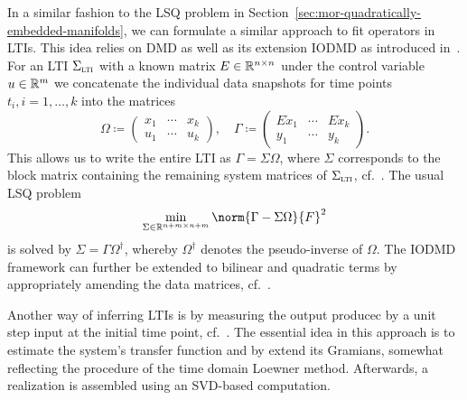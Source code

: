 In a similar fashion to the \ac{LSQ} problem in Section~\ref{sec:mor-quadratically-embedded-manifolds}, we can formulate a similar approach to fit operators in \acp{LTI}.
This idea relies on \ac{DMD} as well as its extension \ac{IODMD} as introduced in~\cite{Annoni2016}.
For an \ac{LTI} $\Sigma_{\textnormal{\scshape lti}}$ with a known matrix $E \in \mathbb{R}^{n \times n}$ under the control variable $u \in \mathbb{R}^m$ we concatenate the individual data snapshots for time points $t_i, i = 1, \dots, k$ into the matrices
\begin{equation}\label{eq:iodmd-data-matrices}
    \Omega \coloneqq \begin{pmatrix}
        x_1 & \cdots & x_k \\
        u_1 & \cdots & u_k
    \end{pmatrix},\quad \Gamma \coloneqq \begin{pmatrix}
        E \dot{x}_1 & \cdots & E \dot{x}_k \\
        y_1 & \cdots & y_k
    \end{pmatrix}.
\end{equation}
This allows us to write the entire \ac{LTI} as $\Gamma = \Sigma \Omega$, where $\Sigma$ corresponds to the block matrix containing the remaining system matrices of $\Sigma_{\textnormal{\scshape lti}}$, cf.~\cite{Heiland2022}.
The usual \ac{LSQ} problem
\begin{equation*}
    \min\limits_{\Sigma \in \bb{R}^{n + m \times n + m}} \norm{\Gamma - \Sigma \Omega}{F}^2
\end{equation*}
is solved by $\Sigma = \Gamma \Omega^\dagger$, whereby $\Omega^\dagger$ denotes the pseudo-inverse of $\Omega$.
The \ac{IODMD} framework can further be extended to bilinear and quadratic terms by appropriately amending the data matrices, cf.~\cite{Gosea2021}.


Another way of inferring \acp{LTI} is by measuring the output producec by a unit step input at the initial time point, cf.~\cite{Miller2012}.
The essential idea in this approach is to estimate the system's transfer function and by extend its Gramians, somewhat reflecting the procedure of the time domain Loewner method.
Afterwards, a realization is assembled using an SVD-based computation.

